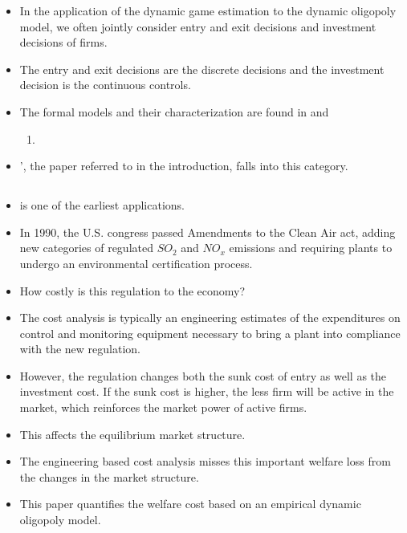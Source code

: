 \documentclass[
]{book}
\providecommand{\tightlist}{%
  \setlength{\itemsep}{0pt}\setlength{\parskip}{0pt}}
\begin{document}
\begin{itemize}
\tightlist
\item
  In the application of the dynamic game estimation to the dynamic
  oligopoly model, we often jointly consider entry and exit decisions
  and investment decisions of firms.
\item
  The entry and exit decisions are the discrete decisions and the
  investment decision is the continuous controls.
\item
  The formal models and their characterization are found in
  \citet{ericsonMarkovPerfectIndustryDynamics1995} and

  \begin{enumerate}
  \def\labelenumi{\arabic{enumi}.}
  \tightlist
  \item
  \end{enumerate}
\item
  \citet{Igami2018}', the paper referred to in the introduction, falls into
  this category.
\end{itemize}

\hypertarget{ryancostenvironmentregulation2012}{%
\subsection{\texorpdfstring{\citet{ryanCostEnvironmentRegulation2012}}{@ryanCostEnvironmentRegulation2012}}\label{ryancostenvironmentregulation2012}}

\begin{itemize}
\tightlist
\item
  \citet{ryanCostEnvironmentRegulation2012} is one of the earliest
  applications.
\item
  In 1990, the U.S. congress passed Amendments to the Clean Air act,
  adding new categories of regulated \(SO_2\) and \(NO_x\) emissions and
  requiring plants to undergo an environmental certification process.
\item
  How costly is this regulation to the economy?
\item
  The cost analysis is typically an engineering estimates of the
  expenditures on control and monitoring equipment necessary to bring
  a plant into compliance with the new regulation.
\item
  However, the regulation changes both the sunk cost of entry as well
  as the investment cost. If the sunk cost is higher, the less firm
  will be active in the market, which reinforces the market power of
  active firms.
\item
  This affects the equilibrium market structure.
\item
  The engineering based cost analysis misses this important welfare
  loss from the changes in the market structure.
\item
  This paper quantifies the welfare cost based on an empirical dynamic
  oligopoly model.
\end{itemize}
\end{document}
